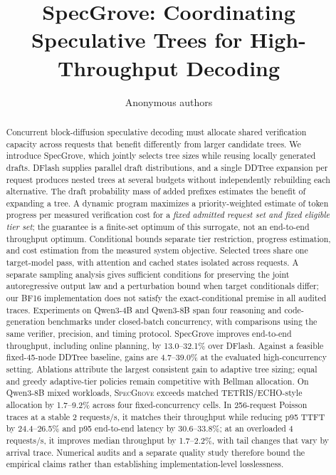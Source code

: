 \documentclass{article}
\title{SpecGrove: Coordinating Speculative Trees for High-Throughput Decoding}
\author{Anonymous authors}
\newcommand{\method}{\textsc{SpecGrove}\xspace}
\begin{document}
\makeatletter
{}
\makeatother
\maketitle
\ificlrfinal
\else
\fi

\begin{abstract}
Concurrent block-diffusion speculative decoding must allocate shared verification capacity across requests that benefit differently from larger candidate trees.
We introduce SpecGrove, which jointly selects tree sizes while reusing locally generated drafts.
DFlash supplies parallel draft distributions, and a single DDTree expansion per request produces nested trees at several budgets without independently rebuilding each alternative.
The draft probability mass of added prefixes estimates the benefit of expanding a tree.
A dynamic program maximizes a priority-weighted estimate of token progress per measured verification cost for a \emph{fixed admitted request set and fixed eligible tier set}; the guarantee is a finite-set optimum of this surrogate, not an end-to-end throughput optimum.
Conditional bounds separate tier restriction, progress estimation, and cost estimation from the measured system objective.
Selected trees share one target-model pass, with attention and cached states isolated across requests.
A separate sampling analysis gives sufficient conditions for preserving the joint autoregressive output law and a perturbation bound when target conditionals differ; our BF16 implementation does not satisfy the exact-conditional premise in all audited traces.
Experiments on Qwen3-4B and Qwen3-8B span four reasoning and code-generation benchmarks under closed-batch concurrency, with comparisons using the same verifier, precision, and timing protocol.
SpecGrove improves end-to-end throughput, including online planning, by 13.0--32.1\% over DFlash.
Against a feasible fixed-45-node DDTree baseline, gains are 4.7--39.0\% at the evaluated high-concurrency setting.
Ablations attribute the largest consistent gain to adaptive tree sizing; equal and greedy adaptive-tier policies remain competitive with Bellman allocation.
On Qwen3-8B mixed workloads, \method exceeds matched TETRIS/ECHO-style allocation by 1.7--9.2\% across four fixed-concurrency cells.
In 256-request Poisson traces at a stable 2 requests/s, it matches their throughput while reducing p95 TTFT by 24.4--26.5\% and p95 end-to-end latency by 30.6--33.8\%; at an overloaded 4 requests/s, it improves median throughput by 1.7--2.2\%, with tail changes that vary by arrival trace.
Numerical audits and a separate quality study therefore bound the empirical claims rather than establishing implementation-level losslessness.
\end{abstract}
\end{document}
